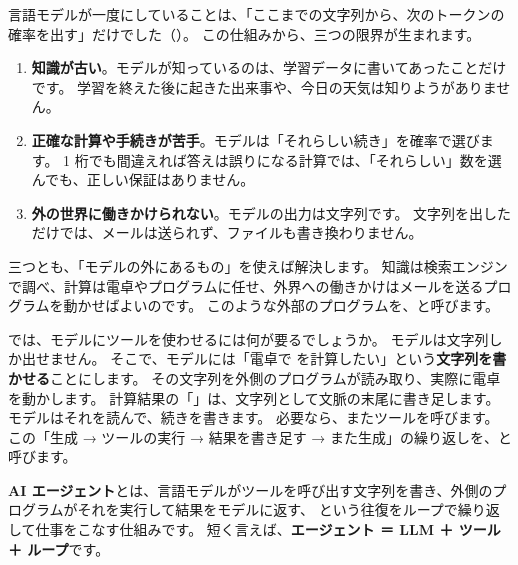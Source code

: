 言語モデルが一度にしていることは、「ここまでの文字列から、次のトークンの確率を出す」だけでした（）。
この仕組みから、三つの限界が生まれます。

\begin{enumerate}
\item \textbf{知識が古い}。モデルが知っているのは、学習データに書いてあったことだけです。
学習を終えた後に起きた出来事や、今日の天気は知りようがありません。
\item \textbf{正確な計算や手続きが苦手}。モデルは「それらしい続き」を確率で選びます。
1 桁でも間違えれば答えは誤りになる計算では、「それらしい」数を選んでも、正しい保証はありません。
\item \textbf{外の世界に働きかけられない}。モデルの出力は文字列です。
文字列を出しただけでは、メールは送られず、ファイルも書き換わりません。
\end{enumerate}

三つとも、「モデルの外にあるもの」を使えば解決します。
知識は検索エンジンで調べ、計算は電卓やプログラムに任せ、外界への働きかけはメールを送るプログラムを動かせばよいのです。
このような外部のプログラムを、と呼びます。

では、モデルにツールを使わせるには何が要るでしょうか。
モデルは文字列しか出せません。
そこで、モデルには「電卓で  を計算したい」という\textbf{文字列を書かせる}ことにします。
その文字列を外側のプログラムが読み取り、実際に電卓を動かします。
計算結果の「」は、文字列として文脈の末尾に書き足します。
モデルはそれを読んで、続きを書きます。
必要なら、またツールを呼びます。
この「生成 → ツールの実行 → 結果を書き足す → また生成」の繰り返しを、と呼びます。

\begin{definition}[AI エージェント]\label{def:agent-def}
\textbf{AI エージェント}とは、言語モデルがツールを呼び出す文字列を書き、外側のプログラムがそれを実行して結果をモデルに返す、
という往復をループで繰り返して仕事をこなす仕組みです。
短く言えば、\textbf{エージェント ＝ LLM ＋ ツール ＋ ループ}です。
\end{definition}

